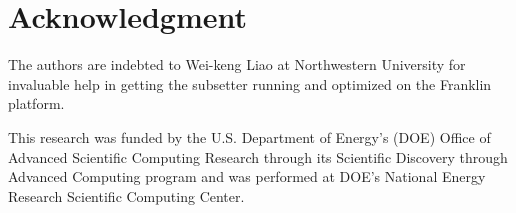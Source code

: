 \section*{Acknowledgment}
The authors are indebted to Wei-keng Liao at Northwestern University for
invaluable help in getting the subsetter running and optimized on the Franklin
platform.

This research was funded by the U.S. Department of Energy's (DOE) Office of
Advanced Scientific Computing Research through its Scientific Discovery
through Advanced Computing program and was performed at DOE's National Energy
Research Scientific Computing Center.
